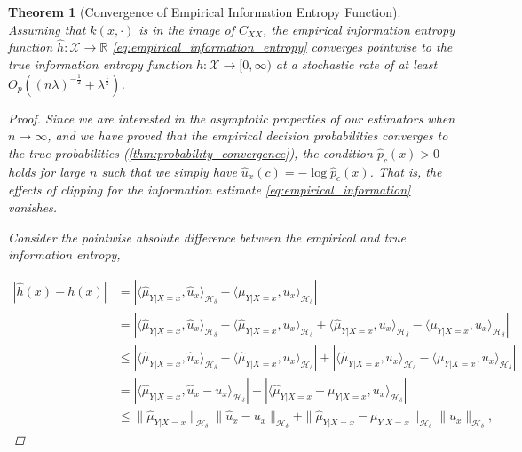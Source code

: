 \documentclass{article}
\newtheorem{theorem}{Theorem}[section]
\begin{document}
	\begin{theorem}[Convergence of Empirical Information Entropy Function]
		\label{thm:entropy_convergence}
		Assuming that $k(x, \cdot)$ is in the image of $C_{XX}$, the empirical information entropy function $\hat{h} : \mathcal{X} \to \mathbb{R}$ \eqref{eq:empirical_information_entropy} converges pointwise to the true information entropy function $h : \mathcal{X} \to [0, \infty)$ at a stochastic rate of at least $O_{p}((n \lambda)^{-\frac{1}{2}} + \lambda^{\frac{1}{2}})$.
		
		\begin{proof}
			Since we are interested in the asymptotic properties of our estimators when $n \to \infty$, and we have proved that the empirical decision probabilities converges to the true probabilities (\cref{thm:probability_convergence}), the condition $\hat{p}_{c}(x) > 0$ holds for large $n$ such that we simply have $\hat{u}_{x}(c) = - \log{\hat{p}_{c}(x)}$. That is, the effects of clipping for the information estimate \eqref{eq:empirical_information} vanishes.
			
			Consider the pointwise absolute difference between the empirical and true information entropy,
			
			\begin{equation}
			\begin{aligned}
				| \hat{h}(x) - h(x) | &= | \langle \hat{\mu}_{Y | X = x}, \hat{u}_{x} \rangle_{\mathcal{H}_{\delta}} - \langle \mu_{Y | X = x}, u_{x} \rangle_{\mathcal{H}_{\delta}} | \\
				&= | \langle \hat{\mu}_{Y | X = x}, \hat{u}_{x} \rangle_{\mathcal{H}_{\delta}} - \langle \hat{\mu}_{Y | X = x}, u_{x} \rangle_{\mathcal{H}_{\delta}} + \langle \hat{\mu}_{Y | X = x}, u_{x} \rangle_{\mathcal{H}_{\delta}} - \langle \mu_{Y | X = x}, u_{x} \rangle_{\mathcal{H}_{\delta}} | \\
				&\leq | \langle \hat{\mu}_{Y | X = x}, \hat{u}_{x} \rangle_{\mathcal{H}_{\delta}} - \langle \hat{\mu}_{Y | X = x}, u_{x} \rangle_{\mathcal{H}_{\delta}} | + | \langle \hat{\mu}_{Y | X = x}, u_{x} \rangle_{\mathcal{H}_{\delta}} - \langle \mu_{Y | X = x}, u_{x} \rangle_{\mathcal{H}_{\delta}} | \\
				&= | \langle \hat{\mu}_{Y | X = x}, \hat{u}_{x} - u_{x} \rangle_{\mathcal{H}_{\delta}} | + | \langle \hat{\mu}_{Y | X = x} - \mu_{Y | X = x}, u_{x} \rangle_{\mathcal{H}_{\delta}} | \\
				&\leq \| \hat{\mu}_{Y | X = x} \|_{\mathcal{H}_{\delta}} \| \hat{u}_{x} - u_{x} \|_{\mathcal{H}_{\delta}} + \| \hat{\mu}_{Y | X = x} - \mu_{Y | X = x} \|_{\mathcal{H}_{\delta}} \| u_{x} \|_{\mathcal{H}_{\delta}},
			\label{eq:information_entropy_bound}
			\end{aligned}
			\end{equation}
			

\end{proof}
\end{theorem}
\end{document}
